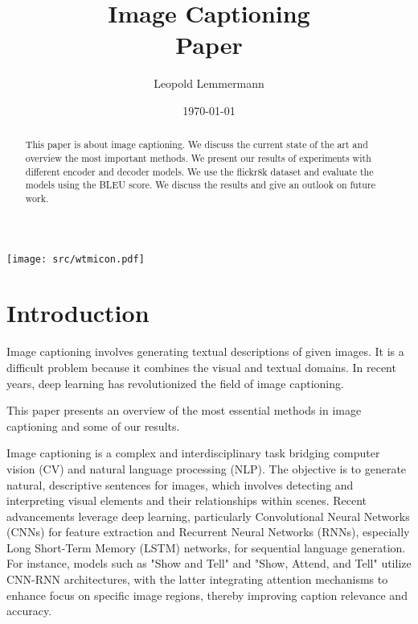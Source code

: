 \documentclass[12pt]{article}
\newcommand{\trauthor}{Leopold Lemmermann}
\newcommand{\trtype}{Paper}
\newcommand{\trtitle}{Image Captioning}
\newcommand{\trdate}{\today}
\theoremstyle{plain}
\theoremstyle{definition}
\theoremstyle{remark}
\begin{document}
\renewcommand{\headheight}{14.5pt}

\fancyhead{}
\fancyhead[CO]{\trtitle}



\title{\trtitle\\[0.3cm]{\normalsize\trtype}}
\author{\trauthor}
\date{\trdate}
\maketitle

\thispagestyle{empty}

\begin{center}
    \texttt{[image: src/wtmicon.pdf]}
\end{center}

\begin{abstract}
 This paper is about image captioning. We discuss the current state of the art and overview the most important methods. We present our results of experiments with different encoder and decoder models. We use the flickr8k dataset and evaluate the models using the BLEU score. We discuss the results and give an outlook on future work.
\end{abstract}

\tableofcontents
\newpage
{}



\section{Introduction}
\label{sec:introduction}

Image captioning involves generating textual descriptions of given images. It is a difficult problem because it combines the visual and textual domains. In recent years, deep learning has revolutionized the field of image captioning.

This paper presents an overview of the most essential methods in image captioning and some of our results.

Image captioning is a complex and interdisciplinary task bridging computer vision (CV) and natural language processing (NLP). The objective is to generate natural, descriptive sentences for images, which involves detecting and interpreting visual elements and their relationships within scenes. Recent advancements leverage deep learning, particularly Convolutional Neural Networks (CNNs) for feature extraction and Recurrent Neural Networks (RNNs), especially Long Short-Term Memory (LSTM) networks, for sequential language generation. For instance, models such as "Show and Tell" \cite{Vinyals:2015} and "Show, Attend, and Tell" \cite{Xu} utilize CNN-RNN architectures, with the latter integrating attention mechanisms to enhance focus on specific image regions, thereby improving caption relevance and accuracy.
\end{document}
